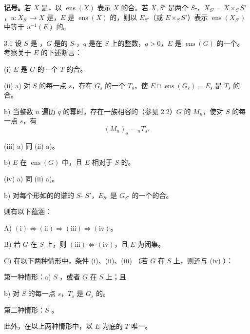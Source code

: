 \textbf{记号。}若 $X$ 是，以 $\operatorname{ens}(X)$ 表示 $X$ 的合。若 $X,S'$ 是两个 $S$-，$X_{S'}=X\times_S S'$，$u:X_{S'}\to X$ 是，$E$ 是 $\operatorname{ens}(X)$ 的，则以 $E_{S'}$（或 $E\times_S S'$）表示 $\operatorname{ens}(X_{S'})$ 中等于 $u^{-1}(E)$ 的。
\begin{SGAresult}{}{3.1}
设 $S$ 是 ，$G$ 是的 $S$-，$q$ 是在 $S$ 上的整数，$q>0$，$E$ 是 $\operatorname{ens}(G)$ 的一个。考察关于 $E$ 的下述断言：

(i)  $E$ 是 $G$ 的一个 $T$ 的合。

(ii) a) 对 $S$ 的每一点 $s$，存在 $G_s$ 的一个 $T_s$，使 $E\cap\operatorname{ens}(G_s)=E_s$ 是 $T_s$ 的合。

b) 当整数 $n$ 遍历 $q$ 的幂时，存在一族相容的（参见 2.2）$G$ 的 $M_n$，使对 $S$ 的每一点 $s$，有
\[(M_n)_s={}_nT_s.\]

(iii) a) 同 (ii) a)。

b)  $E$ 在 $\operatorname{ens}(G)$ 中，且 $E$ 相对于 $S$ 的。

(iv) a) 同 (ii) a)。

b) 对每个形如的的谱的 $S$- $S'$，$E_{S'}$ 是 $G_{S'}$ 的一个的合。

则有以下蕴涵：

A) $\mathrm{(i)}\Longleftrightarrow\mathrm{(ii)}\Longrightarrow\mathrm{(iii)}\Longrightarrow\mathrm{(iv)}$。

B) 若 $G$ 在 $S$ 上，则 $\mathrm{(iii)}\Longleftrightarrow\mathrm{(iv)}$，且 $E$ 为闭集。

C) 在以下两种情形中，条件 (i)、(ii)、(iii) （若 $G$ 在 $S$ 上，则还与 (iv) ）：

第一种情形：a)  $S$ ，或者 $G$ 在 $S$ 上；且

b) 对 $S$ 的每一点 $s$，$T_s$ 是 $G_s$ 的。

第二种情形：$S$ 。

此外，在以上两种情形中，以 $E$ 为底的 $T$ 唯一。
\end{SGAresult}
